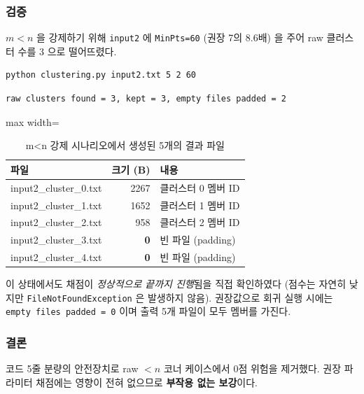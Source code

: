 \documentclass[12pt, a4paper]{article}
\begin{document}
\subsubsection*{검증}

$m < n$ 을 강제하기 위해 \texttt{input2} 에 \texttt{MinPts=60} (권장 7의 8.6배) 을 주어 raw 클러스터 수를 3 으로 떨어뜨렸다.

\begin{verbatim}
python clustering.py input2.txt 5 2 60
\end{verbatim}

\begin{verbatim}
raw clusters found = 3, kept = 3, empty files padded = 2
\end{verbatim}

\begin{table}[h]
\centering
\begin{adjustbox}{max width=\textwidth}
\begin{tabular}{lrl}
\toprule
\textbf{파일} & \textbf{크기 (B)} & \textbf{내용} \\
\midrule
input2\_cluster\_0.txt & 2267 & 클러스터 0 멤버 ID \\
input2\_cluster\_1.txt & 1652 & 클러스터 1 멤버 ID \\
input2\_cluster\_2.txt &  958 & 클러스터 2 멤버 ID \\
input2\_cluster\_3.txt & \textbf{0} & 빈 파일 (padding) \\
input2\_cluster\_4.txt & \textbf{0} & 빈 파일 (padding) \\
\bottomrule
\end{tabular}
\end{adjustbox}
\caption{m<n 강제 시나리오에서 생성된 5개의 결과 파일}
\end{table}

\noindent 이 상태에서도 채점이 \emph{정상적으로 끝까지 진행}됨을 직접 확인하였다 (점수는 자연히 낮지만 \texttt{FileNotFoundException} 은 발생하지 않음). 권장값으로 회귀 실행 시에는 \texttt{empty files padded = 0} 이며 출력 5개 파일이 모두 멤버를 가진다.

\subsubsection*{결론}

코드 5줄 분량의 안전장치로 raw $< n$ 코너 케이스에서 0점 위험을 제거했다. 권장 파라미터 채점에는 영향이 전혀 없으므로 \textbf{부작용 없는 보강}이다.


\end{document}
